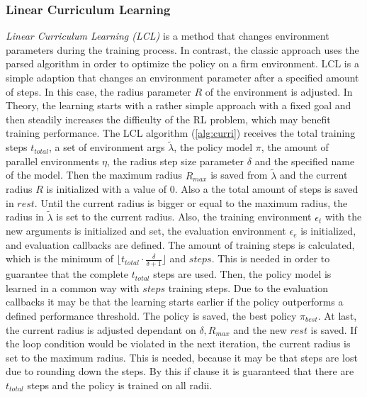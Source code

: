 \subsubsection{Linear Curriculum Learning}
\emph{Linear Curriculum Learning (LCL)} is a method that changes environment parameters during the training process. 
In contrast, the classic approach uses the parsed algorithm in order to optimize the policy on a firm environment. 
LCL is a simple adaption that changes an environment parameter after a specified amount of steps. 
In this case, the radius parameter $R$ of the environment is adjusted. 
In Theory, the learning starts with a rather simple approach with a fixed goal and then steadily increases the difficulty of the RL problem, 
which may benefit training performance.
The LCL algorithm (\cref{alg:curri}) receives the total training steps $t_{total}$, a set of environment args $\tilde{\lambda}$, 
the policy model $\pi$, the amount of parallel environments $\eta$, the radius step size parameter $\delta$ and the specified name of the model.
Then the maximum radius $R_{max}$ is saved from $\tilde{\lambda}$ and the current radius $R$ is initialized with a value of $0$.
Also a the total amount of steps is saved in $rest$.
Until the current radius is bigger or equal to the maximum radius, 
the radius in $\tilde{\lambda}$ is set to the current radius. 
Also, the training environment $\epsilon_t$ with the new arguments is initialized and set, 
the evaluation environment $\epsilon_e$ is initialized, and evaluation callbacks are defined. 
The amount of training steps is calculated, which is the minimum of $\lfloor t_{total} \cdot \frac{\delta}{\delta + 1} \rfloor$ and $steps$.
This is needed in order to guarantee that the complete $t_{total}$ steps are used.
Then, the policy model is learned in a common way with $steps$ training steps. 
Due to the evaluation callbacks it may be that the learning starts earlier if the policy outperforms a defined performance threshold. 
The policy is saved, the best policy $\pi_{best}$.
At last, the current radius is adjusted dependant on $\delta, R_{max}$ and the new $rest$ is saved.
If the loop condition would be violated in the next iteration, the current radius is set to the maximum radius.
This is needed, because it may be that steps are lost due to rounding down the steps. 
By this if clause it is guaranteed that there are $t_{total}$ steps and the policy is trained on all radii.

